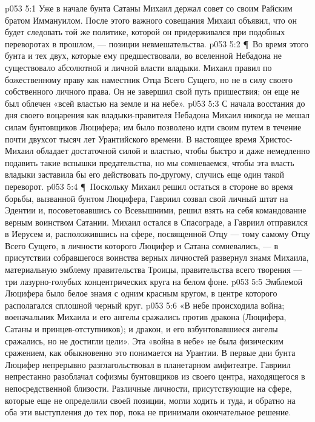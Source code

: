 \vs p053 5:1 Уже в начале бунта Сатаны Михаил держал совет со своим Райским братом Иммануилом. После этого важного совещания Михаил объявил, что он будет следовать той же политике, которой он придерживался при подобных переворотах в прошлом, --- позиции невмешательства.
\vs p053 5:2 \P\ Во время этого бунта и тех двух, которые ему предшествовали, во вселенной Небадона не существовало абсолютной и личной власти владыки. Михаил правил по божественному праву как наместник Отца Всего Сущего, но не в силу своего собственного личного права. Он не завершил свой путь пришествия; он еще не был облечен «всей властью на земле и на небе».
\vs p053 5:3 С начала восстания до дня своего воцарения как владыки\hyp{}правителя Небадона Михаил никогда не мешал силам бунтовщиков Люцифера; им было позволено идти своим путем в течение почти двухсот тысяч лет Урантийского времени. В настоящее время Христос\hyp{}Михаил обладает достаточной силой и властью, чтобы быстро и даже немедленно подавить такие вспышки предательства, но мы сомневаемся, чтобы эта власть владыки заставила бы его действовать по\hyp{}другому, случись еще один такой переворот.
\vs p053 5:4 \P\ Поскольку Михаил решил остаться в стороне во время борьбы, вызванной бунтом Люцифера, Гавриил созвал свой личный штат на Эдентии и, посоветовавшись со Всевышними, решил взять на себя командование верным воинством Сатании. Михаил остался в Спасограде, а Гавриил отправился в Иерусем и, расположившись на сфере, посвященной Отцу --- тому самому Отцу Всего Сущего, в личности которого Люцифер и Сатана сомневались, --- в присутствии собравшегося воинства верных личностей развернул знамя Михаила, материальную эмблему правительства Троицы, правительства всего творения --- три лазурно\hyp{}голубых концентрических круга на белом фоне.
\vs p053 5:5 Эмблемой Люцифера было белое знамя с одним красным кругом, в центре которого располагался сплошной черный круг.
\vs p053 5:6 «В небе происходила война; военачальник Михаила и его ангелы сражались против дракона (Люцифера, Сатаны и принцев\hyp{}отступников); и дракон, и его взбунтовавшиеся ангелы сражались, но не достигли цели». Эта «война в небе» не была физическим сражением, как обыкновенно это понимается на Урантии. В первые дни бунта Люцифер непрерывно разглагольствовал в планетарном амфитеатре. Гавриил непрестанно разоблачал софизмы бунтовщиков из своего центра, находящегося в непосредственной близости. Различные личности, присутствующие на сфере, которые еще не определили своей позиции, могли ходить и туда, и обратно на оба эти выступления до тех пор, пока не принимали окончательное решение.
